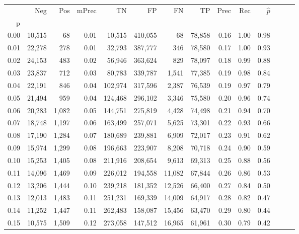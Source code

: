 \begin{tabular}{rrrrrrrrrrrrrr}
\toprule
{} &     Neg &    Pos & mPrec &       TN &       FP &      FN &      TP &  Prec &   Rec & $\hat{p}$ \\
p    &         &        &       &          &          &         &         &       &       &           \\
\midrule
0.00 &  10,515 &     68 &  0.01 &   10,515 &  410,055 &      68 &  78,858 &  0.16 &  1.00 &      0.98 \\
0.01 &  22,278 &    278 &  0.01 &   32,793 &  387,777 &     346 &  78,580 &  0.17 &  1.00 &      0.93 \\
0.02 &  24,153 &    483 &  0.02 &   56,946 &  363,624 &     829 &  78,097 &  0.18 &  0.99 &      0.88 \\
0.03 &  23,837 &    712 &  0.03 &   80,783 &  339,787 &   1,541 &  77,385 &  0.19 &  0.98 &      0.84 \\
0.04 &  22,191 &    846 &  0.04 &  102,974 &  317,596 &   2,387 &  76,539 &  0.19 &  0.97 &      0.79 \\
0.05 &  21,494 &    959 &  0.04 &  124,468 &  296,102 &   3,346 &  75,580 &  0.20 &  0.96 &      0.74 \\
0.06 &  20,283 &  1,082 &  0.05 &  144,751 &  275,819 &   4,428 &  74,498 &  0.21 &  0.94 &      0.70 \\
0.07 &  18,748 &  1,197 &  0.06 &  163,499 &  257,071 &   5,625 &  73,301 &  0.22 &  0.93 &      0.66 \\
0.08 &  17,190 &  1,284 &  0.07 &  180,689 &  239,881 &   6,909 &  72,017 &  0.23 &  0.91 &      0.62 \\
0.09 &  15,974 &  1,299 &  0.08 &  196,663 &  223,907 &   8,208 &  70,718 &  0.24 &  0.90 &      0.59 \\
0.10 &  15,253 &  1,405 &  0.08 &  211,916 &  208,654 &   9,613 &  69,313 &  0.25 &  0.88 &      0.56 \\
0.11 &  14,096 &  1,469 &  0.09 &  226,012 &  194,558 &  11,082 &  67,844 &  0.26 &  0.86 &      0.53 \\
0.12 &  13,206 &  1,444 &  0.10 &  239,218 &  181,352 &  12,526 &  66,400 &  0.27 &  0.84 &      0.50 \\
0.13 &  12,013 &  1,483 &  0.11 &  251,231 &  169,339 &  14,009 &  64,917 &  0.28 &  0.82 &      0.47 \\
0.14 &  11,252 &  1,447 &  0.11 &  262,483 &  158,087 &  15,456 &  63,470 &  0.29 &  0.80 &      0.44 \\
0.15 &  10,575 &  1,509 &  0.12 &  273,058 &  147,512 &  16,965 &  61,961 &  0.30 &  0.79 &      0.42 \\

\end{tabular}
